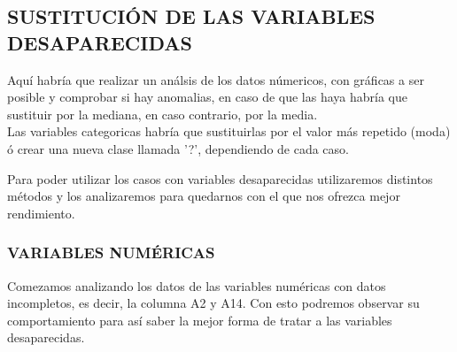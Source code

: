 \documentclass[11pt]{article}
\begin{document}
    \subsection{SUSTITUCIÓN DE LAS VARIABLES
DESAPARECIDAS}\label{sustituciuxf3n-de-las-variables-desaparecidas}

    Aquí habría que realizar un análsis de los datos númericos, con gráficas
a ser posible y comprobar si hay anomalias, en caso de que las haya
habría que sustituir por la mediana, en caso contrario, por la media.\\
Las variables categoricas habría que sustituirlas por el valor más
repetido (moda) ó crear una nueva clase llamada '?', dependiendo de cada
caso.

    Para poder utilizar los casos con variables desaparecidas utilizaremos
distintos métodos y los analizaremos para quedarnos con el que nos
ofrezca mejor rendimiento.

    \subsubsection{VARIABLES NUMÉRICAS}\label{variables-numuxe9ricas}

    Comezamos analizando los datos de las variables numéricas con datos
incompletos, es decir, la columna A2 y A14. Con esto podremos observar
su comportamiento para así saber la mejor forma de tratar a las
variables desaparecidas.
\end{document}

